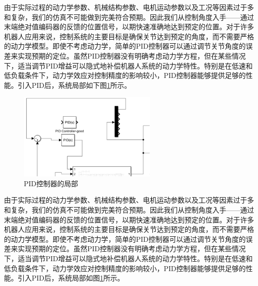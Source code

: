 由于实际过程的动力学参数、机械结构参数、电机运动参数以及工况等因素过于多和复杂，我们的仿真不可能做到完美符合预期。因此我们从控制角度入手——通过末端绝对值编码器的反馈的位置信号，以期快速准确地达到预定的位置。对于许多机器人应用来说，控制系统的主要目标是确保关节达到预定的角度，而不需要严格的动力学模型。即使不考虑动力学，简单的PID控制器可以通过调节关节角度的误差来实现预期的定位。虽然PID控制器没有明确考虑动力学方程，但在某些情况下，适当调节PID增益可以隐式地补偿机器人系统的动力学特性。特别是在低速和低负载条件下，动力学效应对控制精度的影响较小，PID控制器能够提供足够的性能。引入PID后，系统局部如下图\ref{fig:28}所示。

\begin{figure}[htbp]
    \centering
    \includegraphics[width=0.6\textwidth]{Image/fig34.png}
    \caption{PID控制器的局部}
    \label{fig:28}
\end{figure}

由于实际过程的动力学参数、机械结构参数、电机运动参数以及工况等因素过于多和复杂，我们的仿真不可能做到完美符合预期。因此我们从控制角度入手——通过末端绝对值编码器的反馈的位置信号，以期快速准确地达到预定的位置。对于许多机器人应用来说，控制系统的主要目标是确保关节达到预定的角度，而不需要严格的动力学模型。即使不考虑动力学，简单的PID控制器可以通过调节关节角度的误差来实现预期的定位。虽然PID控制器没有明确考虑动力学方程，但在某些情况下，适当调节PID增益可以隐式地补偿机器人系统的动力学特性。特别是在低速和低负载条件下，动力学效应对控制精度的影响较小，PID控制器能够提供足够的性能。引入PID后，系统局部如图\ref{fig:28}所示。

